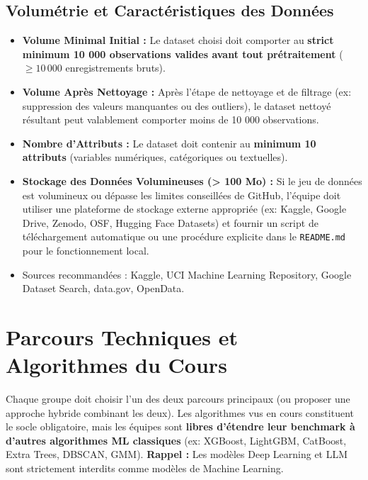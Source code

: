 \documentclass[11pt,a4paper]{article}
\begin{document}
\subsection{Volumétrie et Caractéristiques des Données}
\begin{itemize}[leftmargin=*]
    \item \textbf{Volume Minimal Initial :} Le dataset choisi doit comporter au \textbf{strict minimum 10 000 observations valides avant tout prétraitement} ($\ge 10\,000$ enregistrements bruts).
    \item \textbf{Volume Après Nettoyage :} Après l'étape de nettoyage et de filtrage (ex: suppression des valeurs manquantes ou des outliers), le dataset nettoyé résultant peut valablement comporter moins de 10 000 observations.
    \item \textbf{Nombre d'Attributs :} Le dataset doit contenir au \textbf{minimum 10 attributs} (variables numériques, catégoriques ou textuelles).
    \item \textbf{Stockage des Données Volumineuses (> 100 Mo) :} Si le jeu de données est volumineux ou dépasse les limites conseillées de GitHub, l'équipe doit utiliser une plateforme de stockage externe appropriée (ex: Kaggle, Google Drive, Zenodo, OSF, Hugging Face Datasets) et fournir un script de téléchargement automatique ou une procédure explicite dans le \texttt{README.md} pour le fonctionnement local.
    \item Sources recommandées : Kaggle, UCI Machine Learning Repository, Google Dataset Search, data.gov, OpenData.
\end{itemize}

\section{Parcours Techniques et Algorithmes du Cours}

Chaque groupe doit choisir l'un des deux parcours principaux (ou proposer une approche hybride combinant les deux). Les algorithmes vus en cours constituent le socle obligatoire, mais les équipes sont \textbf{libres d'étendre leur benchmark à d'autres algorithmes ML classiques} (ex: XGBoost, LightGBM, CatBoost, Extra Trees, DBSCAN, GMM). \textbf{Rappel :} Les modèles Deep Learning et LLM sont strictement interdits comme modèles de Machine Learning.
\end{document}
